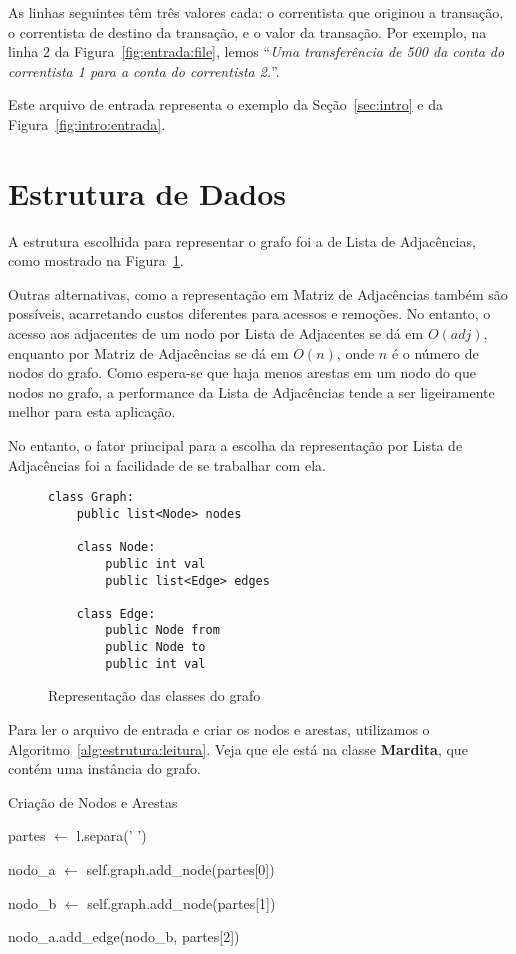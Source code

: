 \documentclass[12pt]{article}
\begin{document}
As linhas seguintes têm três valores cada: o correntista que originou a
transação, o correntista de destino da transação, e o valor da transação. Por
exemplo, na linha 2 da Figura~\ref{fig:entrada:file}, lemos ``\textit{Uma
transferência de 500 da conta do correntista 1 para a conta do correntista 2.}''.

Este arquivo de entrada representa o exemplo da Seção~\ref{sec:intro} e da
Figura~\ref{fig:intro:entrada}.

\section{Estrutura de Dados}\label{sec:estrutura}

A estrutura escolhida para representar o grafo foi a de Lista de Adjacências, como
mostrado na Figura~\ref{fig:estrutura:classes}.

Outras alternativas, como a representação em Matriz de Adjacências também são
possíveis, acarretando custos diferentes para acessos e remoções. No entanto, o
acesso aos adjacentes de um nodo por Lista de Adjacentes se dá em $O(adj)$,
enquanto por Matriz de Adjacências se dá em $O(n)$, onde $n$ é o número de nodos
do grafo. Como espera-se que haja menos arestas em um nodo do que nodos no
grafo, a performance da Lista de Adjacências tende a ser ligeiramente melhor
para esta aplicação.

No entanto, o fator principal para a escolha da representação por Lista de
Adjacências foi a facilidade de se trabalhar com ela.

\begin{figure}[H]
    \begin{lstlisting}
class Graph:
    public list<Node> nodes

    class Node:
        public int val
        public list<Edge> edges

    class Edge:
        public Node from
        public Node to
        public int val
    \end{lstlisting}
  \caption{Representação das classes do grafo}
\label{fig:estrutura:classes}
\end{figure}

Para ler o arquivo de entrada e criar os nodos e arestas, utilizamos o
Algoritmo~\ref{alg:estrutura:leitura}. Veja que ele está na classe
\textsf{\textbf{Mardita}}, que contém uma instância do grafo.

\begin{algorithm}[H]
 \caption{Criação de Nodos e Arestas}
 \label{alg:estrutura:leitura}
    {
        partes $\gets$ l.separa(' ') 

        nodo\_a $\gets$ self.graph.add\_node(partes[0])

        nodo\_b $\gets$ self.graph.add\_node(partes[1])

        nodo\_a.add\_edge(nodo\_b, partes[2]) 
    }
\end{algorithm}
\end{document}

